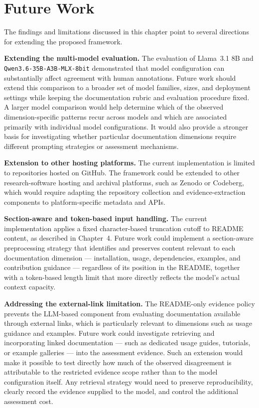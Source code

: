 \section{Future Work}

The findings and limitations discussed in this chapter point to
several directions for extending the proposed framework.

\textbf{Extending the multi-model evaluation.}
The evaluation of Llama~3.1 8B and
\texttt{Qwen3.6-35B-A3B-MLX-8bit} demonstrated that model
configuration can substantially affect agreement with human
annotations. Future work should extend this comparison to a broader
set of model families, sizes, and deployment settings while keeping
the documentation rubric and evaluation procedure fixed. A larger
model comparison would help determine which of the observed
dimension-specific patterns recur across models and which are
associated primarily with individual model configurations. It would
also provide a stronger basis for investigating whether particular
documentation dimensions require different prompting strategies or
assessment mechanisms.

\textbf{Extension to other hosting platforms.}
The current implementation is limited to repositories hosted on
GitHub. The framework could be extended to other research-software
hosting and archival platforms, such as Zenodo or Codeberg, which
would require adapting the repository collection and
evidence-extraction components to platform-specific metadata and APIs.

\textbf{Section-aware and token-based input handling.} The current
implementation applies a fixed character-based truncation cutoff to
README content, as described in Chapter~4. Future work could
implement a section-aware preprocessing strategy that identifies and
preserves content relevant to each documentation dimension ---
installation, usage, dependencies, examples, and contribution
guidance --- regardless of its position in the README, together with
a token-based length limit that more directly reflects the model's
actual context capacity.

\textbf{Addressing the external-link limitation.}
The README-only evidence policy prevents the LLM-based component from
evaluating documentation available through external links, which is
particularly relevant to dimensions such as usage guidance and
examples. Future work could investigate retrieving and incorporating
linked documentation --- such as dedicated usage guides, tutorials,
or example galleries --- into the assessment evidence. Such an
extension would make it possible to test directly how much of the
observed disagreement is attributable to the restricted evidence
scope rather than to the model configuration itself. Any retrieval
strategy would need to preserve reproducibility, clearly record the
evidence supplied to the model, and control the additional assessment
cost.

